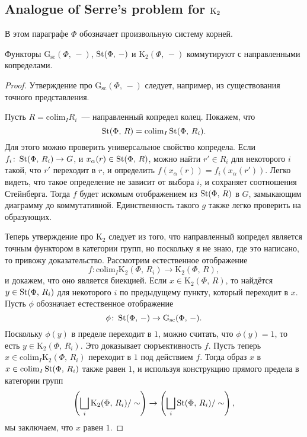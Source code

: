 \documentclass[oneside, 11pt]{amsart}
\begin{document}
\subsection{Analogue of Serre's problem for ${\mathrm{K}}_2$}

В этом параграфе $\Phi$ обозначает произвольную систему корней.

\begin{lemma}
\label{k2cdc}
Функторы  $\mathrm G_{\mathrm{sc}}(\Phi,\,-)$, $\mathop{\mathrm{St}}\nolimits(\Phi,\,-)$ и $\mathrm K_2(\Phi,\,-)$ коммутируют с направленными копределами. 
\end{lemma}
\begin{proof}
Утверждение про $\mathrm G_{\mathrm{sc}}(\Phi,\,-)$ следует, например, из существования точного представления. 

Пусть $R=\mathrm{colim}_I R_i$~--- направленный копредел колец. Покажем, что 
$$
\mathop{\mathrm{St}}\nolimits(\Phi,\,R)=\mathrm{colim}_I\mathop{\mathrm{St}}\nolimits(\Phi,\,R_i).
$$
Для этого можно проверить универсальное свойство копредела. Если $f_i\colon\mathop{\mathrm{St}}\nolimits(\Phi,\,R_i)\rightarrow G$, и $x_\alpha(r)\in\mathop{\mathrm{St}}\nolimits(\Phi,\,R)$, можно найти $r'\in R_i$ для некоторого $i$ такой, что $r'$ переходит в $r$, и определить $f(x_\alpha(r))=f_i(x_\alpha(r'))$. Легко видеть, что такое определение не зависит от выбора $i$, и сохраняет соотношения Стейнберга. Тогда $f$ будет искомым отображением из $\mathop{\mathrm{St}}\nolimits(\Phi,\,R)$ в $G$, замыкающим диаграмму до коммутативной. Единственность такого $g$ также легко проверить на образующих.

Теперь утверждение про $\mathrm K_2$ следует из того, что направленный копредел является точным функтором в категории групп, но поскольку я не знаю, где это написано, то привожу доказательство. Рассмотрим естественное отображение
$$
f\colon\mathrm{colim}_I\mathrm K_2(\Phi,\,R_i)\rightarrow\mathrm K_2(\Phi,\,R),
$$
и докажем, что оно является биекцией. Если $x\in\mathrm K_2(\Phi,\,R)$, то найдётся $y\in\mathop{\mathrm{St}}\nolimits(\Phi,\,R_i)$ для некоторого $i$ по предыдущему пункту, который переходит в $x$. Пусть $\phi$ обозначает естественное отображение
$$
\phi\colon\mathop{\mathrm{St}}\nolimits(\Phi,\,-)\rightarrow\mathrm G_{\mathrm{sc}}(\Phi,\,-).
$$
Поскольку $\phi(y)$ в пределе переходит в $1$, можно считать, что $\phi(y)=1$, то есть $y\in\mathrm K_2(\Phi,\,R_i)$. Это доказывает сюръективность $f$. Пусть теперь $x\in\mathrm{colim}_I\mathrm K_2(\Phi,\,R_i)$ переходит в $1$ под действием $f$. Тогда образ $x$ в $x\in\mathrm{colim}_I\mathop{\mathrm{St}}\nolimits(\Phi,\,R_i)$ также равен $1$, и используя конструкцию прямого предела в категории групп
$$
\left(\bigsqcup_i\mathrm K_2(\Phi,\,R_i)/\sim\right)\rightarrow\left(\bigsqcup_i\mathop{\mathrm{St}}\nolimits(\Phi,\,R_i)/\sim\right),
$$
мы заключаем, что $x$ равен $1$.
\end{proof}
\end{document}
